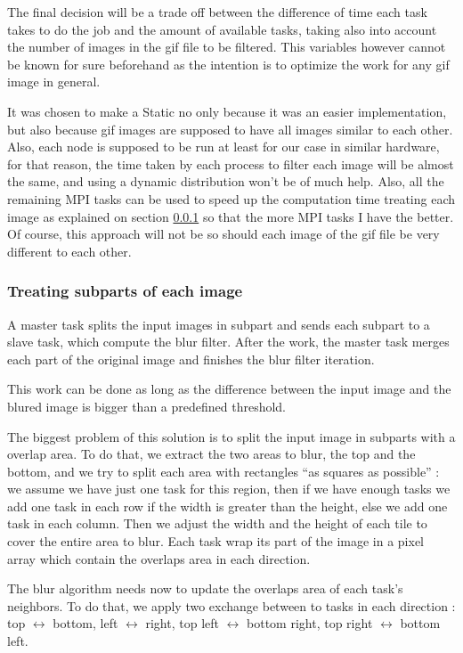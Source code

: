 \documentclass[conference,compsoc]{IEEEtran}
\begin{document}
The final decision will be a trade off between the difference of time each task takes to do the job and the amount of available tasks, taking also into account the number of images in the gif file to be filtered. This variables however cannot be known for sure beforehand as the intention is to optimize the work for any gif image in general.

It was chosen to make a Static no only because it was an easier implementation, but also because gif images are supposed to have all images similar to each other. Also, each node is supposed to be run at least for our case in similar hardware, for that reason, the time taken by each process to filter each image will be almost the same, and using a dynamic distribution won't be of much help. 
Also, all the remaining MPI tasks can be used to speed up the computation time treating each image as explained on section \ref{sec:treating_subparts} so that the more MPI tasks I have the better.
Of course, this approach will not be so should each image of the gif file be very different to each other.

\subsubsection{Treating subparts of each image} \label{sec:treating_subparts}
A master task splits the input images in subpart and sends each subpart to a slave task, which compute the blur filter.
After the work, the master task merges each part of the original image and finishes the blur filter iteration.

This work can be done as long as the difference between the input image and the blured image is bigger than a predefined threshold.

The biggest problem of this solution is to split the input image in subparts with a overlap area. To do that, we extract the two areas to blur, the top and the bottom, and we try to split each area with rectangles ``as squares as possible'' : we assume we have just one task for this region, then if we have enough tasks we add one task in each row if the width is greater than the height, else we add one task in each column.
Then we adjust the width and the height of each tile to cover the entire area to blur. Each task wrap its part of the image in a pixel array which contain the overlaps area in each direction.

The blur algorithm needs now to update the overlaps area of each task's neighbors. To do that, we apply two exchange between to tasks in each direction : top $\leftrightarrow$ bottom, left $\leftrightarrow$ right, top left $\leftrightarrow$ bottom right, top right $\leftrightarrow$ bottom left.
\end{document}
